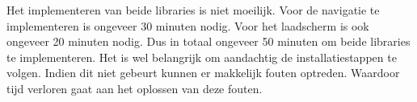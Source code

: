 Het implementeren van beide libraries is niet moeilijk. Voor de navigatie te implementeren 
is ongeveer 30 minuten nodig. Voor het laadscherm is ook ongeveer 20 minuten nodig. Dus in totaal 
ongeveer 50 minuten om beide libraries te implementeren. Het is wel belangrijk 
om aandachtig de installatiestappen te volgen. Indien dit niet gebeurt kunnen er makkelijk fouten optreden.
Waardoor tijd verloren gaat aan het oplossen van deze fouten.


